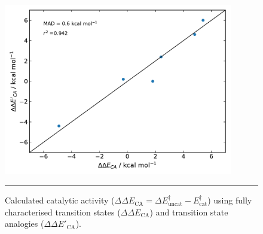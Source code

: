 \documentclass[../../main.tex]{subfiles}
\begin{document}
\begin{figure}[h!]
	\vspace{0.4cm}
	\centering
	\includegraphics[width=10cm]{3/da//figs/figS30}
	\vspace{0.2cm}
	\hrule
	\caption{Calculated catalytic activity ($\Delta\Delta E_\text{CA} = \Delta E^\ddagger_\text{uncat} - E^\ddagger_\text{cat}$) using fully characterised transition states ($\Delta\Delta E_\text{CA}$) and transition state analogies ($\Delta\Delta E'_\text{CA}$).}
	\label{fig::si_da_30}
\end{figure}


\clearpage
\end{document}
